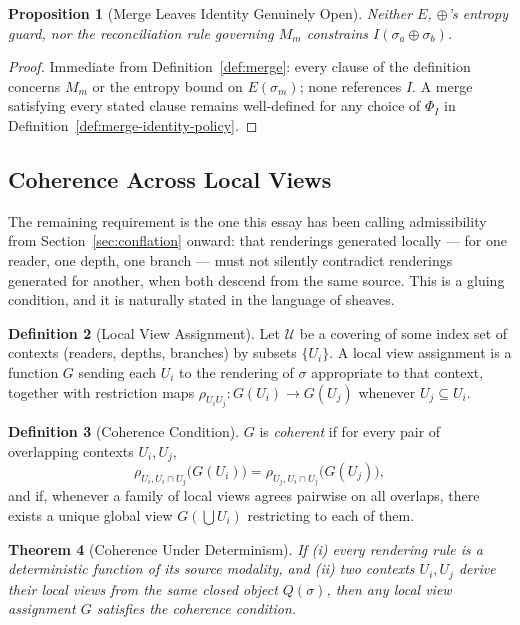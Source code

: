 \documentclass[11pt]{article}
\newtheorem{theorem}{Theorem}[section]
\newtheorem{proposition}[theorem]{Proposition}
\theoremstyle{definition}
\newtheorem{definition}[theorem]{Definition}
\begin{document}
\begin{proposition}[Merge Leaves Identity Genuinely Open]
\label{prop:merge-identity-open}
Neither $E$, $\oplus$'s entropy guard, nor the reconciliation rule governing $M_m$ constrains $I(\sigma_a \oplus \sigma_b)$.
\end{proposition}
\begin{proof}
Immediate from Definition~\ref{def:merge}: every clause of the definition concerns $M_m$ or the entropy bound on $E(\sigma_m)$; none references $I$. A merge satisfying every stated clause remains well-defined for any choice of $\Phi_I$ in Definition~\ref{def:merge-identity-policy}.
\end{proof}

\subsection{Coherence Across Local Views}

The remaining requirement is the one this essay has been calling admissibility from Section~\ref{sec:conflation} onward: that renderings generated locally --- for one reader, one depth, one branch --- must not silently contradict renderings generated for another, when both descend from the same source. This is a gluing condition, and it is naturally stated in the language of sheaves.

\begin{definition}[Local View Assignment]
\label{def:local-view}
Let $\mathcal{U}$ be a covering of some index set of contexts (readers, depths, branches) by subsets $\{U_i\}$. A local view assignment is a function $G$ sending each $U_i$ to the rendering of $\sigma$ appropriate to that context, together with restriction maps $\rho_{U_i U_j} : G(U_i) \to G(U_j)$ whenever $U_j \subseteq U_i$.
\end{definition}

\begin{definition}[Coherence Condition]
\label{def:coherence-condition}
$G$ is \emph{coherent} if for every pair of overlapping contexts $U_i, U_j$,
\[
\rho_{U_i, U_i \cap U_j}\bigl(G(U_i)\bigr) = \rho_{U_j, U_i \cap U_j}\bigl(G(U_j)\bigr),
\]
and if, whenever a family of local views agrees pairwise on all overlaps, there exists a unique global view $G(\bigcup U_i)$ restricting to each of them.
\end{definition}

\begin{theorem}[Coherence Under Determinism]
\label{thm:coherence}
If (i) every rendering rule is a deterministic function of its source modality, and (ii) two contexts $U_i, U_j$ derive their local views from the same closed object $Q(\sigma)$, then any local view assignment $G$ satisfies the coherence condition.
\end{theorem}
\end{document}
